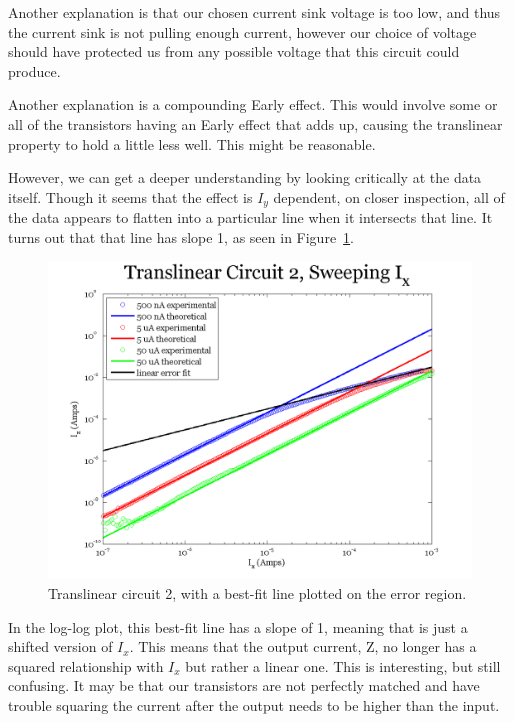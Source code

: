 \documentclass{article}
\begin{document}
Another explanation is that our chosen current sink voltage is too low, and thus the current sink is not pulling enough current, however our choice of voltage should have protected us from any possible voltage that this circuit could produce.

Another explanation is a compounding Early effect.  This would involve some or all of the transistors having an Early effect that adds up, causing the translinear property to hold a little less well.  This might be reasonable.

However, we can get a deeper understanding by looking critically at the data itself.  Though it seems that the effect is $I_y$ dependent, on closer inspection, all of the data appears to flatten into a particular line when it intersects that line.  It turns out that that line has slope 1, as seen in Figure~\ref{fig:err}.

\begin{figure}[H]
\begin{center}
\includegraphics[scale=.5]{exp3_sweepx_err.png}
\caption{Translinear circuit 2, with a best-fit line plotted on the error region.}
\label{fig:err}
\end{center}
\end{figure}

In the log-log plot, this best-fit line has a slope of 1, meaning that is just a shifted version of $I_x$.  This means that the output current, Z, no longer has a squared relationship with $I_x$ but rather a linear one.  This is interesting, but still confusing.  It may be that our transistors are not perfectly matched and have trouble squaring the current after the output needs to be higher than the input.
\end{document}
